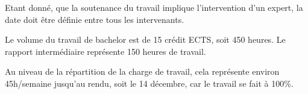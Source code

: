 Etant donné, que la soutenance du travail implique l'intervention d'un expert, la date doit être définie entre tous les intervenants.

Le volume du travail de bachelor est de 15 crédit ECTS, soit 450 heures. Le rapport intermédiaire représente 150 heures de travail. 

Au niveau de la répartition de la charge de travail, cela représente environ 45h/semaine jusqu'au rendu, soit le 14 décembre, car le travail se fait à 100\%. 

